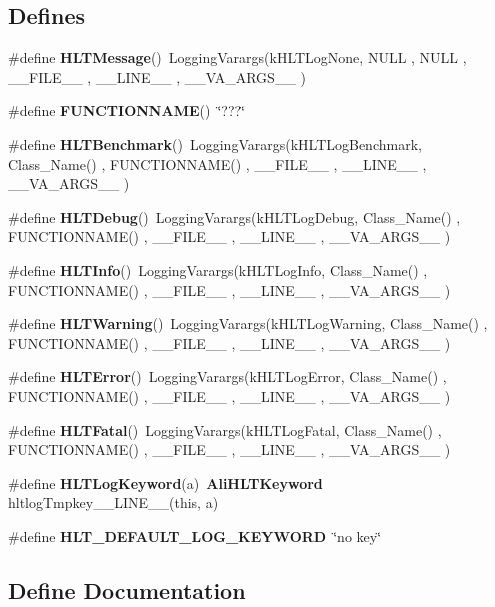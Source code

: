 \subsection*{Defines}
\begin{CompactItemize}
\item 
\#define {\bf HLTMessage}()\ Logging\-Varargs(k\-HLTLog\-None,      NULL , NULL , \_\-\_\-FILE\_\-\_\- , \_\-\_\-LINE\_\-\_\- , \_\-\_\-VA\_\-ARGS\_\-\_\- )
\item 
\#define {\bf FUNCTIONNAME}()\ \char`\"{}???\char`\"{}
\item 
\#define {\bf HLTBenchmark}()\ Logging\-Varargs(k\-HLTLog\-Benchmark, Class\_\-Name() , FUNCTIONNAME() , \_\-\_\-FILE\_\-\_\- , \_\-\_\-LINE\_\-\_\- , \_\-\_\-VA\_\-ARGS\_\-\_\- )
\item 
\#define {\bf HLTDebug}()\ Logging\-Varargs(k\-HLTLog\-Debug,     Class\_\-Name() , FUNCTIONNAME() , \_\-\_\-FILE\_\-\_\- , \_\-\_\-LINE\_\-\_\- , \_\-\_\-VA\_\-ARGS\_\-\_\- )
\item 
\#define {\bf HLTInfo}()\ Logging\-Varargs(k\-HLTLog\-Info,      Class\_\-Name() , FUNCTIONNAME() , \_\-\_\-FILE\_\-\_\- , \_\-\_\-LINE\_\-\_\- , \_\-\_\-VA\_\-ARGS\_\-\_\- )
\item 
\#define {\bf HLTWarning}()\ Logging\-Varargs(k\-HLTLog\-Warning,   Class\_\-Name() , FUNCTIONNAME() , \_\-\_\-FILE\_\-\_\- , \_\-\_\-LINE\_\-\_\- , \_\-\_\-VA\_\-ARGS\_\-\_\- )
\item 
\#define {\bf HLTError}()\ Logging\-Varargs(k\-HLTLog\-Error,     Class\_\-Name() , FUNCTIONNAME() , \_\-\_\-FILE\_\-\_\- , \_\-\_\-LINE\_\-\_\- , \_\-\_\-VA\_\-ARGS\_\-\_\- )
\item 
\#define {\bf HLTFatal}()\ Logging\-Varargs(k\-HLTLog\-Fatal,     Class\_\-Name() , FUNCTIONNAME() , \_\-\_\-FILE\_\-\_\- , \_\-\_\-LINE\_\-\_\- , \_\-\_\-VA\_\-ARGS\_\-\_\- )
\item 
\#define {\bf HLTLog\-Keyword}(a)\ {\bf Ali\-HLTKeyword} hltlog\-Tmpkey\_\-\_\-LINE\_\-\_\-(this, a)
\item 
\#define {\bf HLT\_\-DEFAULT\_\-LOG\_\-KEYWORD}\ \char`\"{}no key\char`\"{}
\end{CompactItemize}


\subsection{Define Documentation}
